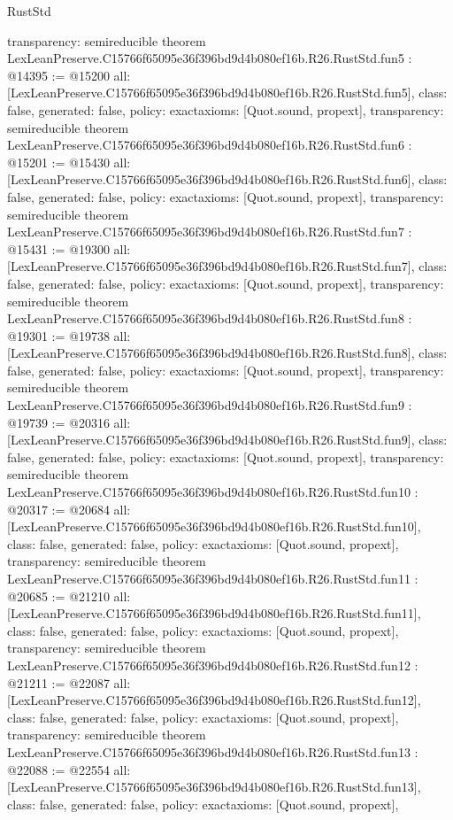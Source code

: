 \begin{lexlean}{RustStd}
\begin{coremodule}
{  transparency: semireducible
}
theorem LexLeanPreserve.C15766f65095e36f396bd9d4b080ef16b.R26.RustStd.fun5 : @14395 := @15200 {
  all: [LexLeanPreserve.C15766f65095e36f396bd9d4b080ef16b.R26.RustStd.fun5],
  class: false,
  generated: false,
  policy: exact{axioms: [Quot.sound, propext]},
  transparency: semireducible
}
theorem LexLeanPreserve.C15766f65095e36f396bd9d4b080ef16b.R26.RustStd.fun6 : @15201 := @15430 {
  all: [LexLeanPreserve.C15766f65095e36f396bd9d4b080ef16b.R26.RustStd.fun6],
  class: false,
  generated: false,
  policy: exact{axioms: [Quot.sound, propext]},
  transparency: semireducible
}
theorem LexLeanPreserve.C15766f65095e36f396bd9d4b080ef16b.R26.RustStd.fun7 : @15431 := @19300 {
  all: [LexLeanPreserve.C15766f65095e36f396bd9d4b080ef16b.R26.RustStd.fun7],
  class: false,
  generated: false,
  policy: exact{axioms: [Quot.sound, propext]},
  transparency: semireducible
}
theorem LexLeanPreserve.C15766f65095e36f396bd9d4b080ef16b.R26.RustStd.fun8 : @19301 := @19738 {
  all: [LexLeanPreserve.C15766f65095e36f396bd9d4b080ef16b.R26.RustStd.fun8],
  class: false,
  generated: false,
  policy: exact{axioms: [Quot.sound, propext]},
  transparency: semireducible
}
theorem LexLeanPreserve.C15766f65095e36f396bd9d4b080ef16b.R26.RustStd.fun9 : @19739 := @20316 {
  all: [LexLeanPreserve.C15766f65095e36f396bd9d4b080ef16b.R26.RustStd.fun9],
  class: false,
  generated: false,
  policy: exact{axioms: [Quot.sound, propext]},
  transparency: semireducible
}
theorem LexLeanPreserve.C15766f65095e36f396bd9d4b080ef16b.R26.RustStd.fun10 : @20317 := @20684 {
  all: [LexLeanPreserve.C15766f65095e36f396bd9d4b080ef16b.R26.RustStd.fun10],
  class: false,
  generated: false,
  policy: exact{axioms: [Quot.sound, propext]},
  transparency: semireducible
}
theorem LexLeanPreserve.C15766f65095e36f396bd9d4b080ef16b.R26.RustStd.fun11 : @20685 := @21210 {
  all: [LexLeanPreserve.C15766f65095e36f396bd9d4b080ef16b.R26.RustStd.fun11],
  class: false,
  generated: false,
  policy: exact{axioms: [Quot.sound, propext]},
  transparency: semireducible
}
theorem LexLeanPreserve.C15766f65095e36f396bd9d4b080ef16b.R26.RustStd.fun12 : @21211 := @22087 {
  all: [LexLeanPreserve.C15766f65095e36f396bd9d4b080ef16b.R26.RustStd.fun12],
  class: false,
  generated: false,
  policy: exact{axioms: [Quot.sound, propext]},
  transparency: semireducible
}
theorem LexLeanPreserve.C15766f65095e36f396bd9d4b080ef16b.R26.RustStd.fun13 : @22088 := @22554 {
  all: [LexLeanPreserve.C15766f65095e36f396bd9d4b080ef16b.R26.RustStd.fun13],
  class: false,
  generated: false,
  policy: exact{axioms: [Quot.sound, propext]},
}
\end{coremodule}
\end{lexlean}
